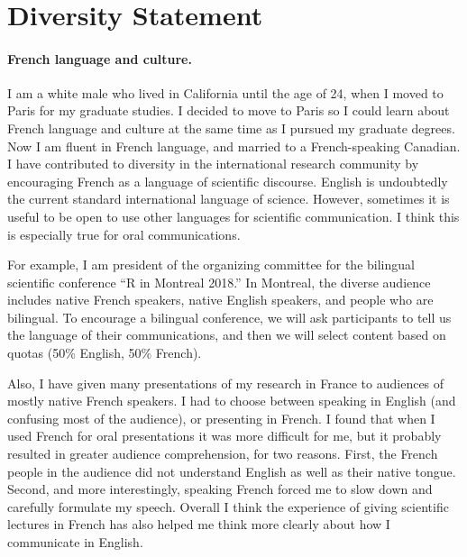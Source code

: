 \documentclass{article}
\begin{document}
 \mbox{ }

\section*{\centering Diversity Statement}

\paragraph{French language and culture.}
I am a white male who lived in California until the age of 24, when I
moved to Paris for my graduate studies. I decided to move to Paris so
I could learn about French language and culture at the same time as I
pursued my graduate degrees. Now I am fluent in French language, and
married to a French-speaking Canadian.
I have contributed to diversity in the international research
community by encouraging French as a language of scientific
discourse. English is undoubtedly the current standard international
language of science. However, sometimes it is useful to be open to use
other languages for scientific communication. I think this is
especially true for oral communications.

For example, I am president of the organizing committee for the
bilingual scientific conference ``R in Montreal 2018.'' In Montreal,
the diverse audience includes native French speakers, native English
speakers, and people who are bilingual. To encourage a bilingual
conference, we will ask participants to tell us the language of their
communications, and then we will select content based on quotas (50\%
English, 50\% French).


Also, I have given many presentations of my research in
France to audiences of mostly native French speakers. I had to choose
between speaking in English (and confusing most of the audience), or
presenting in French. I found that when I used French for oral
presentations it was more difficult for me, but it probably resulted
in greater audience comprehension, for two reasons. First, the French
people in the audience did not understand English as well as their
native tongue. Second, and more interestingly, speaking French forced
me to slow down and carefully formulate my speech. Overall I think the
experience of giving scientific lectures in French has also helped me
think more clearly about how I communicate in English. 
\end{document}
